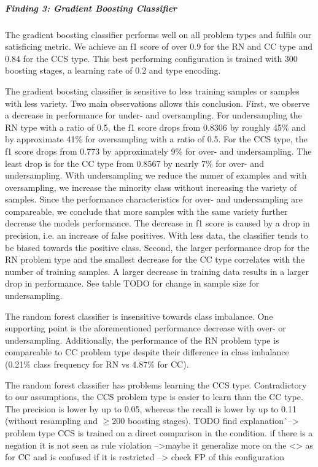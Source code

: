 \subparagraph{Finding 3: Gradient Boosting Classifier}
The gradient boosting classifier performs well on all problem types and fulfils our satisficing  metric. We achieve an f1 score of over 0.9 for the RN and CC type and 0.84 for the CCS type. This best performing configuration is trained with 300 boosting stages, a learning rate of 0.2 and type encoding.


The gradient boosting classifier is sensitive to less training samples or samples with less variety. Two main observations allows this conclusion. First, we observe a decrease in performance for under- and oversampling. For undersampling the RN type with a ratio of 0.5, the f1 score drops from 0.8306 by roughly 45\% and by approximate 41\% for oversampling with a ratio of 0.5. For the CCS type, the f1 score drops from 0.773 by approximately 9\% for over- and undersampling. The least drop is for the CC type from 0.8567 by nearly 7\% for over- and undersampling. With undersampling we reduce the numer of examples and with oversampling, we increase the minority class without increasing the variety of samples. Since the performance characteristics for over- and undersampling are compareable, we conclude that more samples with the same variety further decrease the models performance. The decrease in f1 score is caused by a drop in precision, i.e. an increase of false positives. With less data, the classifier tends to be biased towards the positive class.
Second, the larger performance drop for the RN problem type and the smallest decrease for the CC type correlates with the number of training samples. A larger decrease in training data results in a larger drop in performance. See table TODO for change in sample size for undersampling. 

The random forest classifier is insensitive towards class imbalance. One supporting point is the aforementioned performance decrease with over- or undersampling. Additionally, the performance of the RN problem type is compareable to CC problem type despite their difference in class imbalance (0.21\% class frequency for RN vs 4.87\% for CC). 

The random forest classifier has problems learning the CCS type. Contradictory to our assumptions, the CCS problem type is easier to learn than the CC type. The precision is lower by up to 0.05, whereas the recall is lower by up to 0.11 (without resampling and $\geq 200$ boosting stages). TODO find explanation^^ --> problem type CCS is trained on a direct comparison in the condition. if there is a negation it is not seen as rule violation -->maybe it generalize more on the <> as for CC and is confused if it is restricted --> check FP of this configuration

